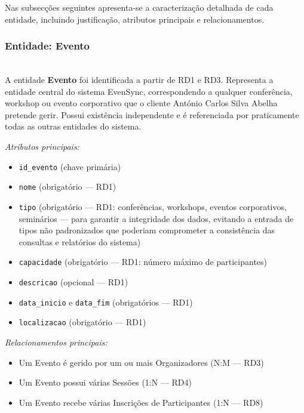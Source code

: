 \documentclass[runningheads]{llncs}
\begin{document}
                Nas subsecções seguintes apresenta-se a caracterização detalhada de cada entidade,
                incluindo justificação, atributos principais e relacionamentos.

                \noindent\begin{minipage}{\textwidth}
                \subsubsection{Entidade: Evento}\mbox{}\\
                A entidade \textbf{Evento} foi identificada a partir de RD1 e RD3. Representa a entidade
                central do sistema EvenSync, correspondendo a qualquer conferência, workshop ou evento
                corporativo que o cliente António Carlos Silva Abelha pretende gerir. Possui existência independente
                e é referenciada por praticamente todas as outras entidades do sistema.

                \vspace{0.2cm}
                \noindent\textit{Atributos principais:}
                \begin{itemize}
                    \item \texttt{id\_evento} (chave primária)
                    \item \texttt{nome} (obrigatório --- RD1)
                    \item \texttt{tipo} (obrigatório --- RD1: conferências, workshops, eventos corporativos, seminários --- para garantir a integridade dos dados, evitando a entrada de tipos não padronizados que poderiam comprometer a consistência das consultas e relatórios do sistema)
                    \item \texttt{capacidade} (obrigatório --- RD1: número máximo de participantes)
                    \item \texttt{descricao} (opcional --- RD1)
                    \item \texttt{data\_inicio} e \texttt{data\_fim} (obrigatórios --- RD1)
                    \item \texttt{localizacao} (obrigatório --- RD1)
                \end{itemize}

                \vspace{0.2cm}
                \noindent\textit{Relacionamentos principais:}
                \begin{itemize}
                    \item Um Evento é gerido por um ou mais Organizadores (N:M --- RD3)
                    \item Um Evento possui várias Sessões (1:N --- RD4)
                    \item Um Evento recebe várias Inscrições de Participantes (1:N --- RD8)
                \end{itemize}
                \end{minipage}
\end{document}
